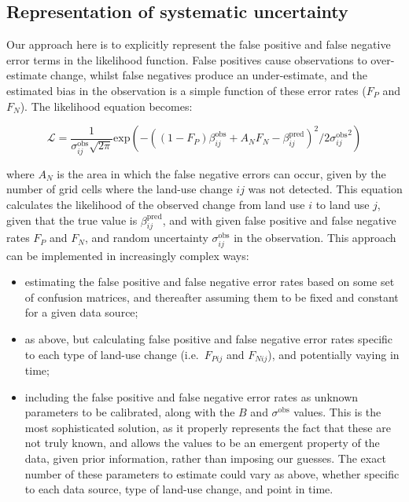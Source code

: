 \documentclass[
]{book}
\begin{document}
\hypertarget{representation-of-systematic-uncertainty}{%
\subsection{Representation of systematic uncertainty}\label{representation-of-systematic-uncertainty}}

Our approach here is to explicitly represent the false positive and false negative error terms in the likelihood function. False positives cause observations to over-estimate change, whilst false negatives produce an under-estimate, and the estimated bias in the observation is a simple function of these error rates (\(F_P\) and \(F_N\)). The likelihood equation becomes:

\begin{equation} \label{eq:likBetaDelta}
 \mathcal{L} = \frac{1}{\sigma_{ij}^\mathrm{obs} \sqrt{2\pi}} \mathrm{exp}(-((1-F_P) \beta_{ij}^{\mathrm{obs}} + A_N F_N - \beta_{ij}^{\mathrm{pred}})^2/2 {\sigma_{ij}^\mathrm{obs}}^2)
\end{equation}

where \(A_N\) is the area in which the false negative errors can occur, given by the number of grid cells where the land-use change \(ij\) was not detected. This equation calculates the likelihood of the observed change from land use \(i\) to land use \(j\), given that the true value is \(\beta_{ij}^{\mathrm{pred}}\), and with given false positive and false negative rates \(F_P\) and \(F_N\), and random uncertainty \(\sigma_{ij}^\mathrm{obs}\) in the observation. This approach can be implemented in increasingly complex ways:

\begin{itemize}
\item
  estimating the false positive and false negative error rates based on some set of confusion matrices, and thereafter assuming them to be fixed and constant for a given data source;
\item
  as above, but calculating false positive and false negative error rates specific to each type of land-use change (i.e.~\(F_{Pij}\) and \(F_{Nij}\)), and potentially vaying in time;
\item
  including the false positive and false negative error rates as unknown parameters to be calibrated, along with the \(B\) and \(\sigma^{\mathrm{obs}}\) values. This is the most sophisticated solution, as it properly represents the fact that these are not truly known, and allows the values to be an emergent property of the data, given prior information, rather than imposing our guesses. The exact number of these parameters to estimate could vary as above, whether specific to each data source, type of land-use change, and point in time.
\end{itemize}
\end{document}
